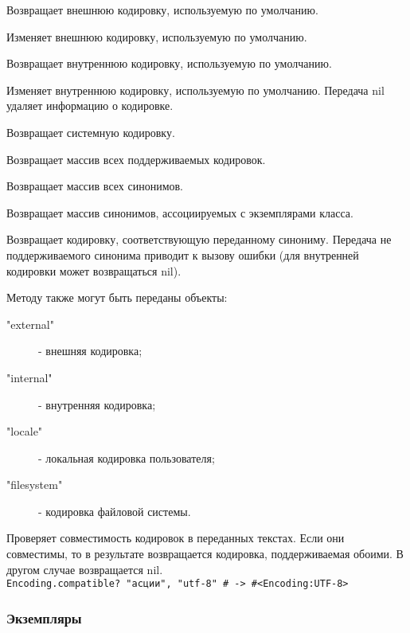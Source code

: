 \begin{methodlist}
  Возвращает внешнюю кодировку, используемую по умолчанию. 
 

  Изменяет внешнюю кодировку, используемую по умолчанию. 

  Возвращает внутреннюю кодировку, используемую по умолчанию. 
 

  Изменяет внутреннюю кодировку, используемую по умолчанию. Передача nil удаляет информацию о кодировке.

  Возвращает системную кодировку. 
 
  Возвращает массив всех поддерживаемых кодировок. 
 
  Возвращает массив всех синонимов. 
 
  Возвращает массив синонимов, ассоциируемых с экземплярами класса. 
 
  Возвращает кодировку, соответствующую переданному синониму. Передача не поддерживаемого синонима приводит к вызову ошибки (для внутренней кодировки может возвращаться nil).

  Методу также могут быть переданы объекты: 
  \begin{description}
    \item["external"] - внешняя кодировка;
    \item["internal"] - внутренняя кодировка;
    \item["locale"] - локальная кодировка пользователя;
    \item["filesystem"] - кодировка файловой системы.
  \end{description}
 
  Проверяет совместимость кодировок в переданных текстах. Если они совместимы, то в результате возвращается кодировка, поддерживаемая обоими. В другом случае возвращается nil. 
  \\\verb!Encoding.compatible? "асции", "utf-8" # -> #<Encoding:UTF-8>!
\end{methodlist}

\subsubsection*{Экземпляры}

